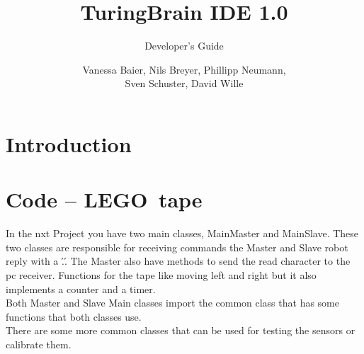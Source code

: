 \documentclass[%
  a4paper,%
  11pt,%
  blue,%
  hyperref	%
  ]{tubsartcl}
\title{TuringBrain IDE \LARGE 1.0}
\subtitle{Developer's Guide}
\author{\small Vanessa Baier, Nils Breyer, Phillipp Neumann,\\ Sven Schuster, David Wille}
\begin{document}
\maketitle[image,logo=right]%

\tableofcontents
\newpage
\section{Introduction}

\section{Code -- LEGO\textregistered\, tape}

In the nxt Project you have two main classes, MainMaster and MainSlave. These two classes are responsible for receiving commands the Master and Slave robot reply with a \'.\'. The Master also have methods to send the read character to the pc receiver. Functions for the tape like moving left and right but it also implements a counter and a timer. \\
Both Master and Slave Main classes import the common class that has some functions that both classes use.\\
There are some more common classes that can be used for testing the sensors or calibrate them.






\end{document}
